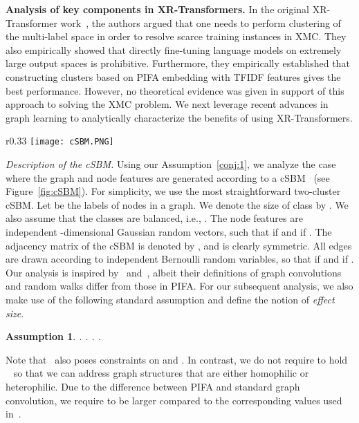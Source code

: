 \documentclass{article} \usepackage{iclr2022_conference,times}
\newtheorem{assumption}[theorem]{Assumption}
\begin{document}
\textbf{Analysis of key components in XR-Transformers.}
In the original XR-Transformer work~\citep{jiong2021fast}, the authors argued that one needs to perform clustering of the multi-label space in order to resolve scarce training instances in XMC. They also empirically showed that directly fine-tuning language models on extremely large output spaces is prohibitive. Furthermore, they empirically established that constructing clusters based on PIFA embedding with TFIDF features gives the best performance. However, no theoretical evidence was given in support of this approach to solving the XMC problem. 
We next leverage recent advances in graph learning to analytically characterize the benefits of using XR-Transformers.

\begin{wrapfigure}{r}{0.33\textwidth}
    \centering
    \vspace{-\intextsep}
    \texttt{[image: cSBM.PNG]}
    \vspace{-0.8cm}
  \caption{Illustration of a cSBM: Node features are independent Gaussian random vectors while edges are modeled as independent Bernoulli random variables.}
  \label{fig:cSBM}
  \vspace{-\intextsep}
\end{wrapfigure}
\textit{Description of the cSBM. }Using our Assumption~\ref{conj:1}, we analyze the case where the graph and node features are generated according to a cSBM~\citep{deshpande2018contextual} (see Figure~\ref{fig:cSBM}). For simplicity, we use the most straightforward two-cluster cSBM. Let  be the labels of nodes in a graph. We denote the size of class  by . We also assume that the classes are balanced, i.e., . The node features  are independent -dimensional Gaussian random vectors, such that  if  and  if . The adjacency matrix of the cSBM is denoted by , and is clearly symmetric. All edges are drawn according to independent Bernoulli random variables, so that  if  and  if . Our analysis is inspired by~\cite{baranwal2021graph} and~\cite{li2019optimizing}, albeit their definitions of graph convolutions and random walks differ from those in PIFA. For our subsequent analysis, we also make use of the following standard assumption and define the notion of \emph{effect size}.
\begin{assumption}\label{ass:1}
	. . . .
\end{assumption}
Note that~\cite{baranwal2021graph} also poses constraints on  and . In contrast, we do not require  to hold ~\citep{baranwal2021graph,li2019optimizing} so that we can address graph structures that are either homophilic or heterophilic. Due to the difference between PIFA and standard graph convolution, we require  to be larger compared to the corresponding values used in~\cite{baranwal2021graph}.
\end{document}
